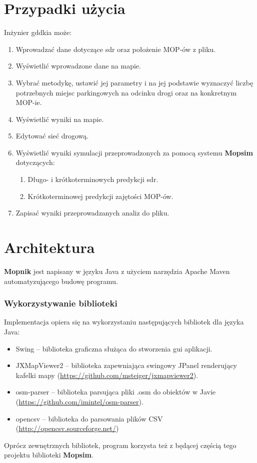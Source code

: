 \section{Przypadki użycia}
Inżynier \acrshort{gddkia} może:
\begin{enumerate}
  \item Wprowadzać dane dotyczące \acrshort{sdr} oraz położenie MOP-ów z pliku.
  \item Wyświetlić wprowadzone dane na mapie.
  \item Wybrać metodykę, ustawić jej parametry i na jej podstawie wyznaczyć
    liczbę potrzebnych miejsc parkingowych na odcinku drogi oraz na konkretnym
    MOP-ie.
  \item Wyświetlić wyniki na mapie.
  \item Edytować sieć drogową. 
  \item Wyświetlić wyniki symulacji przeprowadzonych za pomocą systemu
    \textbf{Mopsim} dotyczących:
    \begin{enumerate}
      \item Długo- i krótkoterminowych predykcji \acrshort{sdr}.
      \item Krótkoterminowej predykcji zajętości MOP-ów.
    \end{enumerate}
  \item Zapisać wyniki przeprowadzanych analiz do pliku.
\end{enumerate}

\section{Architektura}
\textbf{Mopnik} jest napisany w języku Java z użyciem narzędzia Apache
Maven automatyzującego budowę programu.
\subsubsection{Wykorzystywanie biblioteki}
Implementacja opiera się na wykorzystaniu następujących bibliotek dla języka
Java:
\begin{itemize}
\item Swing -- biblioteka graficzna służąca do stworzenia \acrshort{gui} aplikacji.
\item JXMapViewer2 -- biblioteka zapewniająca swingowy JPanel renderujący
  kafelki mapy (\url{https://github.com/msteiger/jxmapviewer2}).
\item osm-parser -- biblioteka parsująca pliki .osm do obiektów w Javie
  (\url{https://github.com/imintel/osm-parser}).
\item opencsv -- biblioteka do parsowania plików CSV
  (\url{http://opencsv.sourceforge.net/})
\end{itemize}
Oprócz zewnętrznych bibliotek, program korzysta też z będącej częścią tego
projektu biblioteki \textbf{Mopsim}. 
